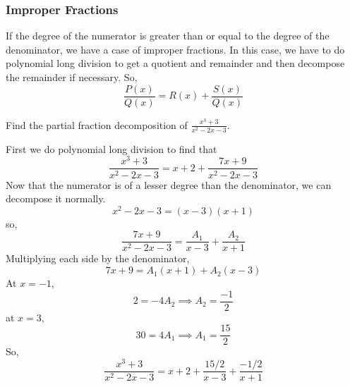 \subsubsection{Improper Fractions}
\noindent
If the degree of the numerator is greater than or equal to the degree of the denominator, we have a case of improper fractions. In this case, we have to do polynomial long division to get a quotient and remainder and then decompose the remainder if necessary. So,
\begin{equation*}
	\frac{P(x)}{Q(x)} = R(x) + \frac{S(x)}{Q(x)}
\end{equation*}

\begin{example}
	Find the partial fraction decomposition of $\frac{x^3+3}{x^2-2x-3}$.
\end{example}
First we do polynomial long division to find that
\begin{equation*}
	\frac{x^3+3}{x^2-2x-3} = x + 2 + \frac{7x+9}{x^2-2x-3}
\end{equation*}
Now that the numerator is of a lesser degree than the denominator, we can decompose it normally.
\begin{equation*}
	x^2-2x-3 = (x-3)(x+1)
\end{equation*}
so,
\begin{equation*}
	\frac{7x+9}{x^2-2x-3} = \frac{A_1}{x-3} + \frac{A_2}{x+1}
\end{equation*}
Multiplying each side by the denominator,
\begin{equation*}
	7x+9 = A_1(x+1) + A_2(x-3)
\end{equation*}
At $x=-1$,
\begin{equation*}
	2 = -4A_2 \implies A_2 = \frac{-1}{2}
\end{equation*}
at $x=3$,
\begin{equation*}
	30 = 4A_1 \implies A_1 = \frac{15}{2}
\end{equation*}
So,
\begin{equation*}
	\frac{x^3+3}{x^2-2x-3} = x + 2 + \frac{15/2}{x-3} + \frac{-1/2}{x+1}
\end{equation*}